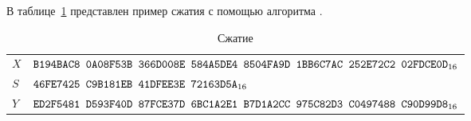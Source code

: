 \label{TEST.Compr}

В таблице~\ref{Table.TEST.Compr} представлен пример сжатия с помощью алгоритма 
. 

\begin{table}[H]
\caption{Сжатие}\label{Table.TEST.Compr}
\begin{tabular}{|l|l|}
\hline
$X$ &
$\texttt{B194BAC8~0A08F53B~366D008E~584A5DE4~8504FA9D~1BB6C7AC~252E72C2~02FDCE0D}_{16}$\\
\dhline
$S$ & 
$\texttt{46FE7425~C9B181EB~41DFEE3E~72163D5A}_{16}$\\
\hline
$Y$ &
$\texttt{ED2F5481~D593F40D~87FCE37D~6BC1A2E1~B7D1A2CC~975C82D3~C0497488~C90D99D8}_{16}$\\
\hline
\end{tabular}
\end{table}
